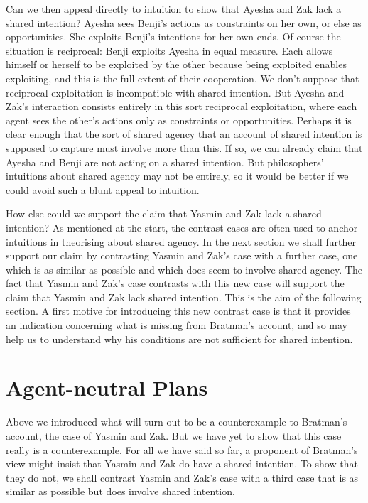 \documentclass[12pt,\papersize]{extarticle}
\begin{document}
Can we then appeal directly to intuition to show that Ayesha and Zak lack a shared intention?
Ayesha sees Benji's actions as constraints on her own, or else as opportunities.
She exploits Benji's intentions for her own ends.
Of course the situation is reciprocal: Benji exploits Ayesha in equal measure.
Each allows himself or herself to be exploited by the other because being exploited enables exploiting,
and this is the full extent of their cooperation. 
We don't suppose that reciprocal exploitation is incompatible with shared intention. 
But Ayesha and Zak's interaction consists entirely in this sort reciprocal exploitation, where each agent sees the other's actions only as constraints or opportunities.
Perhaps it is clear enough that 
the sort of shared agency that an account of shared intention is supposed to capture must involve more than this. 
If so, we can already claim that Ayesha and Benji are not acting on a shared intention.
But philosophers' intuitions about shared agency may not be entirely, so it would be better if we could avoid such a blunt appeal to intuition.

How else could we support the claim that Yasmin and Zak lack a shared intention? 
As mentioned at the start, 
the contrast cases are often used to anchor intuitions in theorising about shared agency.
In the next section we shall further support our claim by contrasting Yasmin and Zak's case with a further case, one which is as similar as possible and which does seem to involve shared agency.
The fact that Yasmin and Zak's case contrasts with this new case will support the claim that Yasmin and Zak lack shared intention.
This is the aim of the following section.
A first motive for introducing this new contrast case is that it provides an indication concerning what is missing from Bratman's account, and so may help us to understand why his conditions are not sufficient for shared intention.



\section{Agent-neutral Plans}
\label{sec:distributed_plan}

Above we introduced what will turn out to be a counterexample to Bratman's account, the case of Yasmin and Zak. 
But we have yet to show that this case really is a counterexample. 
For all we have said so far, a proponent of Bratman's view might insist that Yasmin and Zak do have a shared intention.
To show that they do not,
we shall contrast Yasmin and Zak's case with a third case that is as similar as possible but does involve shared intention. 
\end{document}
